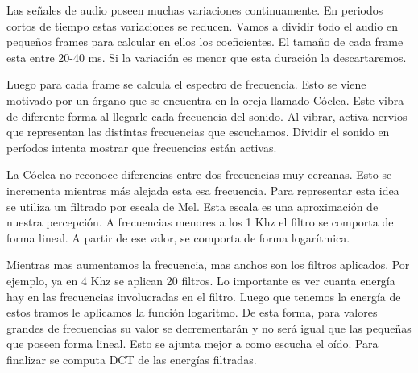 Las señales de audio poseen muchas variaciones continuamente. En periodos cortos de tiempo estas variaciones se reducen. Vamos a dividir todo el audio en pequeños frames para calcular en ellos los coeficientes. El tamaño de cada frame esta entre 20-40 ms. Si la variación es menor que esta duración la descartaremos.

Luego para cada frame se calcula el espectro de frecuencia. Esto se viene motivado por un órgano que se encuentra en la oreja llamado Cóclea. Este vibra de diferente forma al llegarle cada frecuencia del sonido. Al vibrar, activa nervios que representan las distintas frecuencias que escuchamos. Dividir el sonido en períodos intenta mostrar que frecuencias están activas.

La Cóclea no reconoce diferencias entre dos frecuencias muy cercanas. Esto se incrementa mientras más alejada esta esa frecuencia. Para representar esta idea se utiliza un filtrado por escala de Mel. Esta escala es una aproximación de nuestra percepción. A frecuencias menores a los 1 Khz el filtro se comporta de forma lineal. A partir de ese valor, se comporta de forma logarítmica. 


Mientras mas aumentamos la frecuencia, mas anchos son los filtros aplicados. Por ejemplo, ya en 4 Khz se aplican 20 filtros. Lo importante es ver cuanta energía hay en las frecuencias involucradas en el filtro. Luego que tenemos la energía de estos tramos le aplicamos la función logaritmo. De esta forma, para valores grandes de frecuencias su valor se decrementarán y no será igual que las pequeñas que poseen forma lineal. Esto se ajunta mejor a como escucha el oído. Para finalizar se computa DCT de las energías filtradas. 

